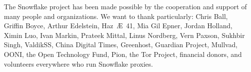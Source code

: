 \documentclass[letterpaper,twocolumn]{article}
\begin{document}
The Snowflake project has been made possible
by the cooperation and support of many people
and organizations.
We want to thank particularly:
Chris Ball, %
Griffin Boyce, %
Arthur Edelstein, %
Haz~Æ~41, %
Mia Gil Epner, %
Jordan Holland, %
Ximin Luo, %
Ivan Markin, %
Prateek Mittal, %
Linus Nordberg, %
Vern Paxson, %
Sukhbir Singh, %
ValdikSS, %
China Digital Times,
Greenhost, %
Guardian Project, %
Mullvad, %
OONI, %
the Open Technology Fund, %
Pion,
the Tor Project,
financial donors,
and volunteers everywhere who run Snowflake proxies.



\end{document}
